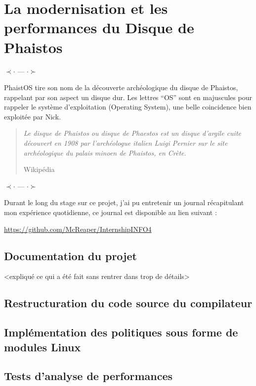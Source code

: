\section{La modernisation et les performances du Disque de Phaistos}
\label{contrib}

\begin{center}
    $\prec \cdot$ --- $\cdot \succ$ 
\end{center}

PhaistOS tire son nom de la découverte archéologique du disque de Phaistos, 
rappelant par son aspect un disque dur. Les lettres ``OS'' sont en majuscules 
pour rappeler le système d'exploitation (Operating System), une belle 
coincidence bien exploitée par Nick. 

\blockquote[Wikipédia][--]{\textit{Le disque de Phaistos ou disque de Phaestos 
est un disque d'argile cuite découvert en 1908 par l'archéologue italien Luigi 
Pernier sur le site archéologique du palais minoen de Phaistos, en Crète.}
}

\begin{center}
    $\prec \cdot$ --- $\cdot \succ$ 
\end{center}

Durant le long du stage sur ce projet, j'ai pu entretenir un journal 
récapitulant mon expérience quotidienne, ce journal est disponible au lien 
suivant :

\begin{center}
\href{https://github.com/McReaper/InternshipINFO4}{https://github.com/McReaper/InternshipINFO4}
\end{center}

\subsection{Documentation du projet}

<expliqué ce qui a été fait sans rentrer dans trop de détails>

\subsection{Restructuration du code source du compilateur} 
\label{warnings}

\subsection{Implémentation des politiques sous forme de modules Linux}

\subsection{Tests d'analyse de performances}
